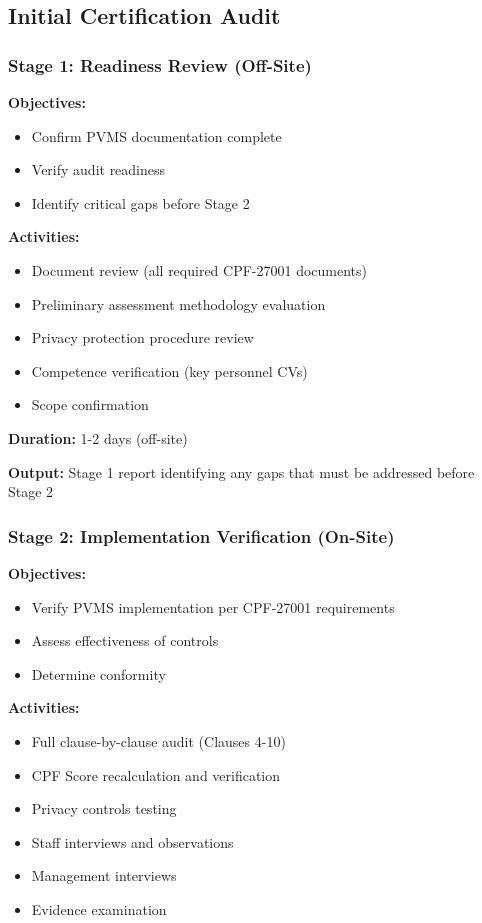\documentclass[11pt,a4paper]{article}
\begin{document}
\subsection{Initial Certification Audit}

\subsubsection{Stage 1: Readiness Review (Off-Site)}

\textbf{Objectives:}
\begin{itemize}
\item Confirm PVMS documentation complete
\item Verify audit readiness
\item Identify critical gaps before Stage 2
\end{itemize}

\textbf{Activities:}
\begin{itemize}
\item Document review (all required CPF-27001 documents)
\item Preliminary assessment methodology evaluation
\item Privacy protection procedure review
\item Competence verification (key personnel CVs)
\item Scope confirmation
\end{itemize}

\textbf{Duration:} 1-2 days (off-site)

\textbf{Output:} Stage 1 report identifying any gaps that must be addressed before Stage 2

\subsubsection{Stage 2: Implementation Verification (On-Site)}

\textbf{Objectives:}
\begin{itemize}
\item Verify PVMS implementation per CPF-27001 requirements
\item Assess effectiveness of controls
\item Determine conformity
\end{itemize}

\textbf{Activities:}
\begin{itemize}
\item Full clause-by-clause audit (Clauses 4-10)
\item CPF Score recalculation and verification
\item Privacy controls testing
\item Staff interviews and observations
\item Management interviews
\item Evidence examination
\end{itemize}
\end{document}

